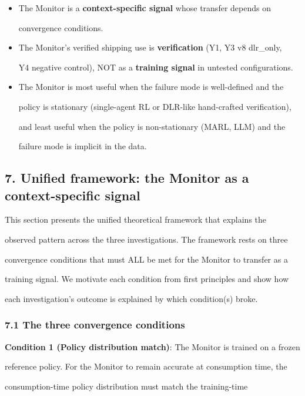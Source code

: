 \documentclass[11pt]{article}
\begin{document}
\begin{itemize}
\item
  The Monitor is a \textbf{context-specific signal} whose transfer
  depends on

  convergence conditions.
\item
  The Monitor's verified shipping use is \textbf{verification} (Y1, Y3
  v8 dlr\_only,

  Y4 negative control), NOT as a \textbf{training signal} in untested
  configurations.
\item
  The Monitor is most useful when the failure mode is well-defined and
  the

  policy is stationary (single-agent RL or DLR-like hand-crafted
  verification),

  and least useful when the policy is non-stationary (MARL, LLM) and the

  failure mode is implicit in the data.
\end{itemize}

\subsection{7. Unified framework: the Monitor as a context-specific
signal}\label{unified-framework-the-monitor-as-a-context-specific-signal}

This section presents the unified theoretical framework that explains
the

observed pattern across the three investigations. The framework rests on
three

convergence conditions that must ALL be met for the Monitor to transfer
as a

training signal. We motivate each condition from first principles and
show how

each investigation's outcome is explained by which condition(s) broke.

\subsubsection{7.1 The three convergence
conditions}\label{the-three-convergence-conditions}

\textbf{Condition 1 (Policy distribution match)}: The Monitor is trained
on a frozen

reference policy. For the Monitor to remain accurate at consumption
time, the

consumption-time policy distribution must match the training-time
\end{document}

